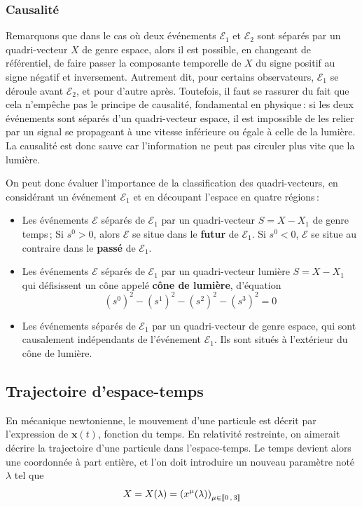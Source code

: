         \subsubsection{Causalité}

        Remarquons que dans le cas où deux événements $\mathcal{E}_1$ et $\mathcal{E}_2$ sont séparés par un quadri-vecteur $X$ de genre espace, alors il est possible, en changeant de référentiel, de faire passer la composante temporelle de $X$ du signe positif au signe négatif et inversement. Autrement dit, pour certains observateurs, $\mathcal{E}_1$ se déroule avant $\mathcal{E}_2$, et pour d’autre après. Toutefois, il faut se rassurer du fait que cela n’empêche pas le principe de causalité, fondamental en physique : si les deux événements sont séparés d’un quadri-vecteur espace, il est impossible de les relier par un signal se propageant à une vitesse inférieure ou égale à celle de la lumière. La causalité est donc sauve car l’information ne peut pas circuler plus vite que la lumière.

        On peut donc évaluer l’importance de la classification des quadri-vecteurs, en considérant un événement $\mathcal{E}_1$ et en découpant l’espace en quatre régions :
        \begin{itemize}
            \item Les événements $\mathcal{E}$ séparés de $\mathcal{E}_1$ par un quadri-vecteur $S = X - X_1$ de genre temps ; Si $s^0 > 0$, alors $\mathcal{E}$ se situe dans le \textbf{futur} de $\mathcal{E}_1$. Si $s^0 < 0$, $\mathcal{E}$ se situe au contraire dans le \textbf{passé} de $\mathcal{E}_1$.
            \item Les événements $\mathcal{E}$ séparés de $\mathcal{E}_1$ par un quadri-vecteur lumière $S = X - X_1$ qui défisissent un cône appelé \textbf{cône de lumière}, d’équation 
            \[ (s^0)^2 - (s^1)^2 - (s^2)^2 - (s^3)^2 = 0 \]  
            \item Les événements séparés de $\mathcal{E}_1$ par un quadri-vecteur de genre espace, qui sont causalement indépendants de l’événement $\mathcal{E}_1$. Ils sont situés à l’extérieur du cône de lumière.  
        \end{itemize}

    \subsection{Trajectoire d’espace-temps}

    En mécanique newtonienne, le mouvement d’une particule est décrit par l’expression de $\mathbf{x}(t)$, fonction du temps. En relativité restreinte, on aimerait décrire la trajectoire d’une particule dans l’espace-temps. Le temps devient alors une coordonnée à part entière, et l’on doit introduire un nouveau paramètre noté $\lambda$ tel que 
    \[ X = X(\lambda) = \left(x^{\mu}(\lambda)\right)_{\mu \in \left[\!\left[ 0 \, , \, 3 \right]\!\right]} \]

